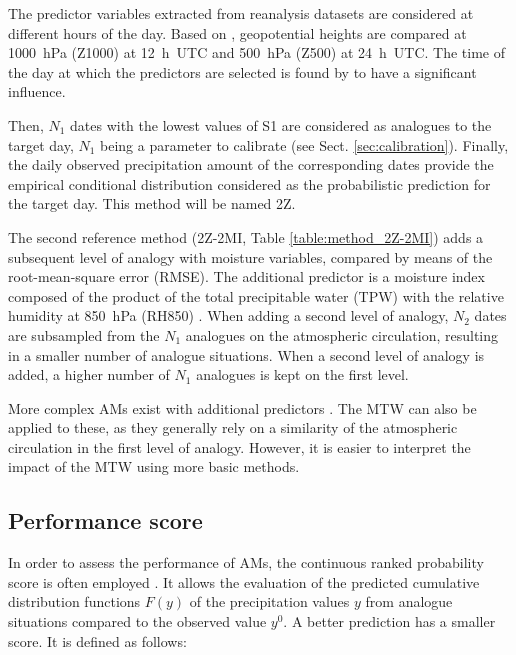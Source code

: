 \documentclass[hess, manuscript]{copernicus}
\begin{document}
	The predictor variables extracted from reanalysis datasets are considered at different hours of the day. Based on \citet{Bontron2005}, geopotential heights are compared at 1000~hPa (Z1000) at 12~h~UTC and 500~hPa (Z500) at 24~h~UTC. The time of the day at which the predictors are selected is found by \citet{Bontron2004} to have a significant influence.
	
	Then, $N_{1}$ dates with the lowest values of S1 are considered as analogues to the target day, $N_{1}$ being a parameter to calibrate (see Sect. \ref{sec:calibration}). Finally, the daily observed precipitation amount of the corresponding dates provide the empirical conditional distribution considered as the probabilistic prediction for the target day. This method will be named 2Z.
	
	The second reference method (2Z-2MI, Table \ref{table:method_2Z-2MI}) adds a subsequent level of analogy with moisture variables, compared by means of the root-mean-square error (RMSE). The additional predictor is a moisture index composed of the product of the total precipitable water (TPW) with the relative humidity at 850~hPa (RH850) \citep{Bontron2004}. When adding a second level of analogy, $N_{2}$ dates are subsampled from the $N_{1}$ analogues on the atmospheric circulation, resulting in a smaller number of analogue situations. When a second level of analogy is added, a higher number of $N_{1}$ analogues is kept on the first level.
	
	More complex AMs exist with additional predictors \citep[see e.g.][]{Horton2012a, BenDaoud2016, Caillouet2016}. The MTW can also be applied to these, as they generally rely on a similarity of the atmospheric circulation in the first level of analogy. However, it is easier to interpret the impact of the MTW using more basic methods.
	
	
	\subsection{Performance score}
	\label{sec:performance}
	
	In order to assess the performance of AMs, the continuous ranked probability score \citep[CRPS,][]{Brown1974, Matheson1976, Hersbach2000} is often employed \citep[see, e.g.,][]{Bontron2004, Bontron2005, BenDaoud2008, Horton2012, Marty2012, Radanovics2013, Chardon2014, Junk2015, BenDaoud2016, Caillouet2016}. It allows the evaluation of the predicted cumulative distribution functions $F(y)$ of the precipitation values $y$ from analogue situations compared to the observed value $y^{0}$. A better prediction has a smaller score. It is defined as follows:
	
\end{document}
